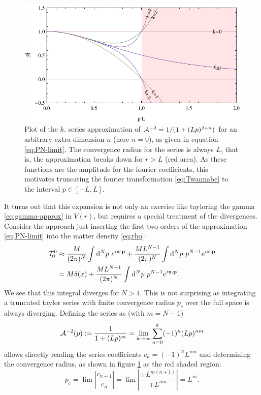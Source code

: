 \documentclass[10pt,a4paper]{article}
\begin{document}
\begin{figure}
\includegraphics[scale=1]{figures/conv-radius.pdf}
\caption{Plot of the $k$. series approximation of ${\cal A}^{-2}=1/(1+(Lp)^{2+n})$ for an arbitrary extra dimension $n$ (here $n=0$), as given in equation \eqref{eq:PN-limit}. The convergence radius for the series is always $L$, that is, the approximation breaks down for $r>L$ (red area). As these functions are the amplitude for the fourier coefficients, this motivates truncating the fourier transformation \eqref{eq:Twannabe} to the interval $p \in [-L,L]$.}\label{fig:conv}
\end{figure}

It turns out that this expansion is not only an exercise like tayloring the gamma \eqref{eq:gamma-approx} in $V(r)$, but requires a special treatment of the divergences. Consider the approach just inserting the first two orders of the approximation \eqref{eq:PN-limit} into the matter density \eqref{eq:rho}:
\begin{align}\label{eq:Twannabe}
{\cal T}^0_0 &\approx
 \frac{M}{(2\pi)^N}
\int \mathrm{d}^N p~ e^{i \mathbf{ x } \cdot \mathbf{ p }}
+ 
\frac{M L^{N-1}}{(2\pi)^N}
\int \mathrm{d}^N p~p^{N-1} e^{i \mathbf{ x } \cdot \mathbf{ p }}
\\
&= M \delta(x)
+ 
\frac{M L^{N-1}}{(2\pi)^N}
\int \mathrm{d}^N p~p^{N-1} e^{i \mathbf{ x } \cdot \mathbf{ p }}.
\end{align}
We see that this integral diverges for $N>1$. This is not surprising as integrating a truncated taylor series with finite convergence radius $p_c$ over the full space is always diverging. Defining the series as (with $m=N-1$)
\begin{equation}\label{eq:def-series}
{\cal A}^{-2}(p) := \frac{1}{1 + (L p)^m}
= \lim_{k\to\infty} \sum_{n=0}^k (-1)^n (Lp)^{n m}
\end{equation} 
allows directly reading the series coefficients $c_n=(-1)^n L^{nm}$ and determining the convergence radius, as shown in figure \ref{fig:conv} as the red shaded region:
\begin{equation}
p_c=\lim \left| \frac{c_{n+1}}{c_n}\right| = \lim \left| \frac{\pm L^{m(n+1)}}{\mp L^{mn}} \right| = L^m.
\end{equation}
\end{document}
